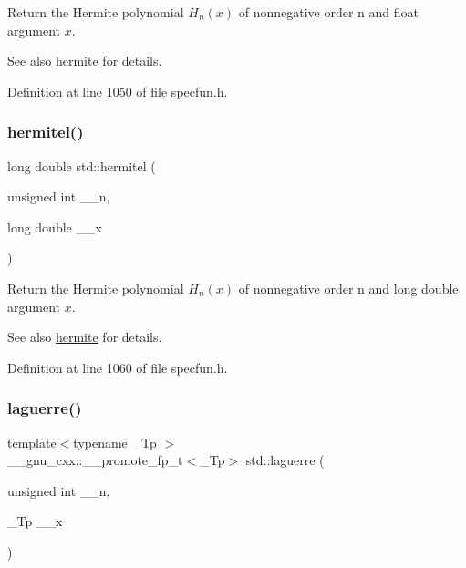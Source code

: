Return the Hermite polynomial $ H_n(x) $ of nonnegative order n and float argument $ x $.

\begin{DoxySeeAlso}{See also}
\hyperlink{group__tr29124__math__spec__func_gaded38c372f2977d30b613bd55426f132}{hermite} for details. 
\end{DoxySeeAlso}


Definition at line 1050 of file specfun.\+h.

\mbox{\label{group__tr29124__math__spec__func_ga21f8e312ee3e65286f86bf141b0f32e0}} 
\subsubsection{\texorpdfstring{hermitel()}{hermitel()}}
{\footnotesize\ttfamily long double std\+::hermitel (\begin{DoxyParamCaption}\item[{unsigned int}]{\+\_\+\+\_\+n,  }\item[{long double}]{\+\_\+\+\_\+x }\end{DoxyParamCaption})\hspace{0.3cm}{\ttfamily [inline]}}

Return the Hermite polynomial $ H_n(x) $ of nonnegative order n and {\ttfamily long double} argument $ x $.

\begin{DoxySeeAlso}{See also}
\hyperlink{group__tr29124__math__spec__func_gaded38c372f2977d30b613bd55426f132}{hermite} for details. 
\end{DoxySeeAlso}


Definition at line 1060 of file specfun.\+h.

\mbox{\label{group__tr29124__math__spec__func_gaf1927ca6432351e3a7af47e158e63862}} 
\subsubsection{\texorpdfstring{laguerre()}{laguerre()}}
{\footnotesize\ttfamily template$<$typename \+\_\+\+Tp $>$ \\
\+\_\+\+\_\+gnu\+\_\+cxx\+::\+\_\+\+\_\+promote\+\_\+fp\+\_\+t$<$\+\_\+\+Tp$>$ std\+::laguerre (\begin{DoxyParamCaption}\item[{unsigned int}]{\+\_\+\+\_\+n,  }\item[{\+\_\+\+Tp}]{\+\_\+\+\_\+x }\end{DoxyParamCaption})\hspace{0.3cm}{\ttfamily [inline]}}

